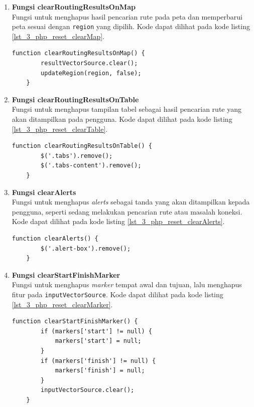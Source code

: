 \begin{enumerate}
	\item \textbf{Fungsi clearRoutingResultsOnMap}\\
	Fungsi untuk menghapus hasil pencarian rute pada peta dan memperbarui peta sesuai dengan \verb!region! yang dipilih. Kode dapat dilihat pada kode listing \ref{lst_3_php_reset_clearMap}.
	\begin{lstlisting}[caption=Fungsi JavaScript untuk menghapus hasil pencarian rute pada peta ,label = {lst_3_php_reset_clearMap}]
	function clearRoutingResultsOnMap() {
		resultVectorSource.clear();
		updateRegion(region, false);
	}
	\end{lstlisting}
	
	\item \textbf{Fungsi clearRoutingResultsOnTable}\\
	Fungsi untuk menghapus tampilan tabel sebagai hasil pencarian rute yang akan ditampilkan pada pengguna. Kode dapat dilihat pada kode listing \ref{lst_3_php_reset_clearTable}.
	
	\begin{lstlisting}[caption=Fungsi JavaScript untuk menghapus tampilan tabel,label = {lst_3_php_reset_clearTable}]
	function clearRoutingResultsOnTable() {
		$('.tabs').remove();
		$('.tabs-content').remove();
	}
	\end{lstlisting}
	
	\item \textbf{Fungsi clearAlerts}\\
	Fungsi untuk menghapus \textit{alerts} sebagai tanda yang akan ditampilkan kepada pengguna, seperti sedang melakukan pencarian rute atau masalah koneksi. Kode dapat dilihat pada kode listing \ref{lst_3_php_reset_clearAlerts}.
	
	\begin{lstlisting}[caption=Fungsi JavaScript untuk menghilangkan \textit{alerts},label = {lst_3_php_reset_clearAlerts}]
	function clearAlerts() {
		$('.alert-box').remove();
	}
	\end{lstlisting}
	
	\item \textbf{Fungsi clearStartFinishMarker}\\
	Fungsi untuk menghapus \textit{marker} tempat awal dan tujuan, lalu menghapus fitur pada \verb!inputVectorSource!. Kode dapat dilihat pada kode listing \ref{lst_3_php_reset_clearMarker}.
	
	\begin{lstlisting}[caption=Fungsi JavaScript untuk menghilangkan \textit{alerts},label = {lst_3_php_reset_clearMarker}]
	function clearStartFinishMarker() {
		if (markers['start'] != null) {
			markers['start'] = null;
		}
		if (markers['finish'] != null) {
			markers['finish'] = null;
		}
		inputVectorSource.clear();
	}
	\end{lstlisting}
	
\end{enumerate}

